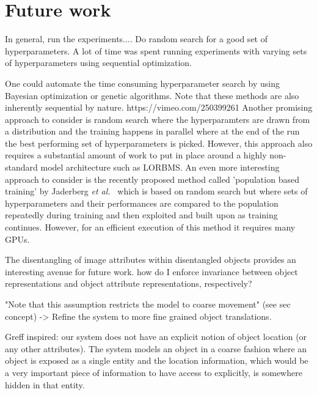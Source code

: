\documentclass[12pt,a4paper]{article}
\begin{document}
\section{Future work}
In general, run the experiments.... Do random search for a good set of hyperparameters. A lot of time was spent running experiments with varying sets of hyperparameters using sequential optimization.

\par One could automate the time consuming hyperparameter search by using Bayesian optimization or genetic algorithms. Note that these methods are also inherently sequential by nature. https://vimeo.com/250399261
Another promising approach to consider is random search where the hyperparamters are drawn from a distribution and the training happens in parallel where at the end of the run the best performing set of hyperparameters is picked. However, this approach also requires a substantial amount of work to put in place around a highly non-standard model architecture such as LORBMS. An even more interesting approach to consider is the recently proposed method called 'population based training' by Jaderberg \textit{et al.}~\cite{PopBasedTraining} which is based on random search but where sets of hyperparameters and their performances are compared to the population repeatedly during training and then exploited and built upon as training continues. However, for an efficient execution of this method it requires many GPUs. 

\par The disentangling of image attributes within disentangled objects provides an interesting avenue for future work. how do I enforce invariance between object representations and object attribute representations, respectively?

\par "Note that this assumption restricts the model to coarse movement" (see sec concept) -> Refine the system to more fine grained object translations.

\par Greff inspired: our system does not have an explicit notion of object location (or any other attributes). The system models an object in a coarse fashion where an object is exposed as a single entity and the location information, which would be a very important piece of information to have access to explicitly, is somewhere hidden in that entity.
\end{document}
